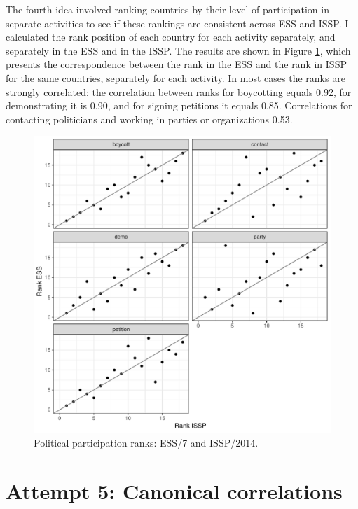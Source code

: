 \documentclass[12pt,]{article}
\begin{document}
The fourth idea involved ranking countries by their level of participation in separate activities to see if these rankings are consistent across ESS and ISSP. I calculated the rank position of each country for each activity separately, and separately in the ESS and in the ISSP. The results are shown in Figure \ref{fig:cntry-ranks}, which presents the correspondence between the rank in the ESS and the rank in ISSP for the same countries, separately for each activity. In most cases the ranks are strongly correlated: the correlation between ranks for boycotting equals 0.92, for demonstrating it is 0.90, and for signing petitions it equals 0.85. Correlations for contacting politicians and working in parties or organizations 0.53.

\begin{figure}[H]

{\centering \includegraphics{report_files/figure-latex/cntry-ranks-1} 

}

\caption{Political participation ranks: ESS/7 and ISSP/2014.}\label{fig:cntry-ranks}
\end{figure}

\hypertarget{attempt-5-canonical-correlations}{%
\section{Attempt 5: Canonical correlations}\label{attempt-5-canonical-correlations}}
\end{document}
